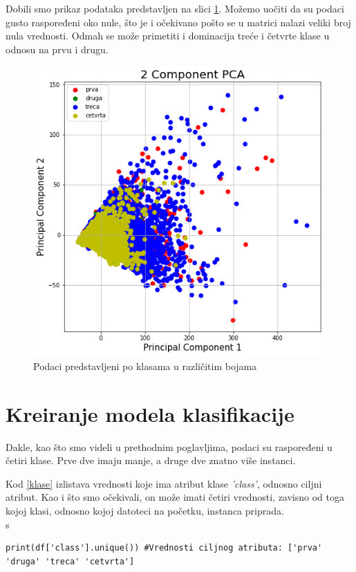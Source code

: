 \documentclass[a4paper]{article}
\begin{document}
Dobili smo prikaz podataka predstavljen na slici \ref{fig:podaci}. Možemo uočiti da su podaci gusto raspoređeni oko nule, što je i očekivano pošto se u matrici nalazi veliki broj nula vrednosti. Odmah se može primetiti i dominacija treće i četvrte klase u odnosu na prvu i drugu.
\begin{figure}[h!]
\begin{center}
\includegraphics[scale=0.4]{plot_data.png}
\end{center}
\caption{Podaci predstavljeni po klasama u različitim bojama}
\label{fig:podaci}
\end{figure}

\section{Kreiranje modela klasifikacije}
\label{sec:obrada}

Dakle, kao što smo videli u prethodnim poglavljima, podaci su raspoređeni u četiri klase. Prve dve imaju manje, a druge dve znatno više instanci. 

Kod \ref{klase} izlistava vrednosti koje ima atribut klase {\em 'class'}, odnosno ciljni atribut. Kao i što smo očekivali, on može imati četiri vrednosti, zavisno od toga kojoj klasi, odnosno kojoj datoteci na početku, instanca priprada.
\\s
\begin{lstlisting}[caption={Moguće vrednosti atributa 'class'},frame=single, label=klase]
print(df['class'].unique()) #Vrednosti ciljnog atributa: ['prva' 'druga' 'treca' 'cetvrta']
\end{lstlisting}
\end{document}
